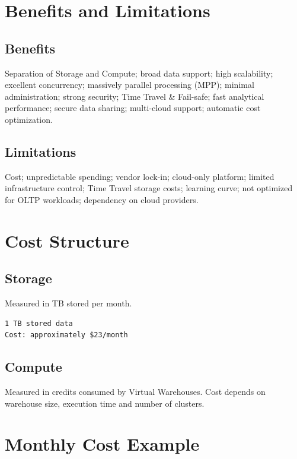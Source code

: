 \documentclass[9pt,a4paper]{article}
\begin{document}
\section{Benefits and Limitations}

\subsection{Benefits}

Separation of Storage and Compute; broad data support; high scalability; excellent concurrency; massively parallel processing (MPP); minimal administration; strong security; Time Travel \& Fail-safe; fast analytical performance; secure data sharing; multi-cloud support; automatic cost optimization.

\subsection{Limitations}

Cost; unpredictable spending; vendor lock-in; cloud-only platform; limited infrastructure control; Time Travel storage costs; learning curve; not optimized for OLTP workloads; dependency on cloud providers.

\section{Cost Structure}

\subsection{Storage}

Measured in TB stored per month.

\begin{lstlisting}
1 TB stored data
Cost: approximately $23/month
\end{lstlisting}

\subsection{Compute}

Measured in credits consumed by Virtual Warehouses. Cost depends on warehouse size, execution time and number of clusters.

\section{Monthly Cost Example}
\end{document}

